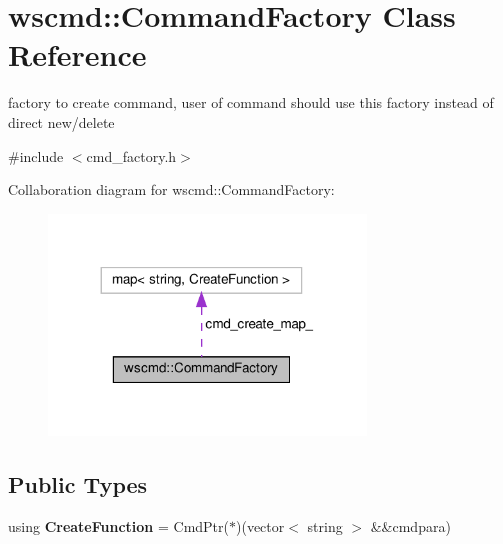 \hypertarget{classwscmd_1_1CommandFactory}{}\section{wscmd\+:\+:Command\+Factory Class Reference}
\label{classwscmd_1_1CommandFactory}


factory to create command, user of command should use this factory instead of direct new/delete  




{\ttfamily \#include $<$cmd\+\_\+factory.\+h$>$}



Collaboration diagram for wscmd\+:\+:Command\+Factory\+:\nopagebreak
\begin{figure}[H]
\begin{center}
\leavevmode
\includegraphics[width=239pt]{classwscmd_1_1CommandFactory__coll__graph}
\end{center}
\end{figure}
\subsection*{Public Types}
\begin{DoxyCompactItemize}
\item 
\mbox{\label{classwscmd_1_1CommandFactory_ab6367255c34f4fd923576469acd58c56}} 
using {\bfseries Create\+Function} = Cmd\+Ptr($\ast$)(vector$<$ string $>$ \&\&cmdpara)
\end{DoxyCompactItemize}
